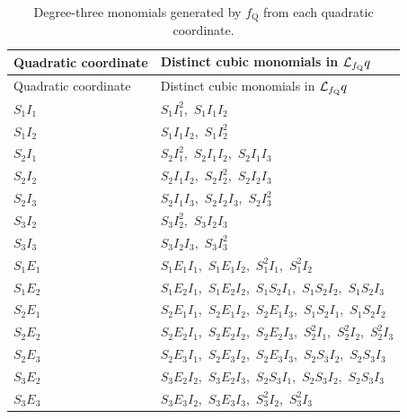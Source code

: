 \begin{longtable}{@{}>{\raggedright\arraybackslash}p{}>{\raggedright\arraybackslash}p{}@{}}
\caption{Degree-three monomials generated by $f_{\mathrm Q}$ from each quadratic coordinate.}
\label{tab:cubic_generation}\\
\toprule
Quadratic coordinate & Distinct cubic monomials in $\mathcal{L}_{f_{\mathrm Q}} q$\\
\midrule
\endfirsthead
\toprule
Quadratic coordinate & Distinct cubic monomials in $\mathcal{L}_{f_{\mathrm Q}} q$\\
\midrule
\endhead
$S_1I_1$ & $S_1I_1^{2}$,\ $S_1I_1I_2$ \\
$S_1I_2$ & $S_1I_1I_2$,\ $S_1I_2^{2}$ \\
$S_2I_1$ & $S_2I_1^{2}$,\ $S_2I_1I_2$,\ $S_2I_1I_3$ \\
$S_2I_2$ & $S_2I_1I_2$,\ $S_2I_2^{2}$,\ $S_2I_2I_3$ \\
$S_2I_3$ & $S_2I_1I_3$,\ $S_2I_2I_3$,\ $S_2I_3^{2}$ \\
$S_3I_2$ & $S_3I_2^{2}$,\ $S_3I_2I_3$ \\
$S_3I_3$ & $S_3I_2I_3$,\ $S_3I_3^{2}$ \\
$S_1E_1$ & $S_1E_1I_1$,\ $S_1E_1I_2$,\ $S_1^{2}I_1$,\ $S_1^{2}I_2$ \\
$S_1E_2$ & $S_1E_2I_1$,\ $S_1E_2I_2$,\ $S_1S_2I_1$,\ $S_1S_2I_2$,\ $S_1S_2I_3$ \\
$S_2E_1$ & $S_2E_1I_1$,\ $S_2E_1I_2$,\ $S_2E_1I_3$,\ $S_1S_2I_1$,\ $S_1S_2I_2$ \\
$S_2E_2$ & $S_2E_2I_1$,\ $S_2E_2I_2$,\ $S_2E_2I_3$,\ $S_2^{2}I_1$,\ $S_2^{2}I_2$,\ $S_2^{2}I_3$ \\
$S_2E_3$ & $S_2E_3I_1$,\ $S_2E_3I_2$,\ $S_2E_3I_3$,\ $S_2S_3I_2$,\ $S_2S_3I_3$ \\
$S_3E_2$ & $S_3E_2I_2$,\ $S_3E_2I_3$,\ $S_2S_3I_1$,\ $S_2S_3I_2$,\ $S_2S_3I_3$ \\
$S_3E_3$ & $S_3E_3I_2$,\ $S_3E_3I_3$,\ $S_3^{2}I_2$,\ $S_3^{2}I_3$ \\
\bottomrule
\end{longtable}

